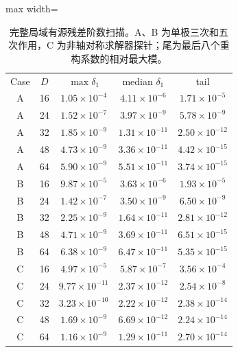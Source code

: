 \begin{table}[htbp]
\centering
\caption{完整局域有源残差阶数扫描。A、B 为单极三次和五次作用，C 为非轴对称求解器探针；尾为最后八个重构系数的相对最大模。}
\label{note-tab:sourced20261008}
\begin{adjustbox}{max width=\textwidth}
\begin{tabular}{ccccc}
Case & $D$ & $\max\delta_1$ & median $\delta_1$ & tail\\
A & 16 & $1.05\times10^{-4}$ & $4.11\times10^{-6}$ & $1.71\times10^{-5}$\\
A & 24 & $1.52\times10^{-7}$ & $3.97\times10^{-9}$ & $5.78\times10^{-9}$\\
A & 32 & $1.85\times10^{-9}$ & $1.31\times10^{-11}$ & $2.50\times10^{-12}$\\
A & 48 & $4.73\times10^{-9}$ & $3.36\times10^{-11}$ & $4.42\times10^{-15}$\\
A & 64 & $5.90\times10^{-9}$ & $5.51\times10^{-11}$ & $3.74\times10^{-15}$\\
B & 16 & $9.87\times10^{-5}$ & $3.63\times10^{-6}$ & $1.93\times10^{-5}$\\
B & 24 & $1.42\times10^{-7}$ & $3.50\times10^{-9}$ & $6.50\times10^{-9}$\\
B & 32 & $2.25\times10^{-9}$ & $1.64\times10^{-11}$ & $2.81\times10^{-12}$\\
B & 48 & $4.71\times10^{-9}$ & $3.69\times10^{-11}$ & $6.51\times10^{-15}$\\
B & 64 & $6.38\times10^{-9}$ & $6.47\times10^{-11}$ & $5.35\times10^{-15}$\\
C & 16 & $4.97\times10^{-5}$ & $5.87\times10^{-7}$ & $3.56\times10^{-4}$\\
C & 24 & $9.77\times10^{-11}$ & $2.37\times10^{-12}$ & $2.54\times10^{-8}$\\
C & 32 & $3.23\times10^{-10}$ & $2.22\times10^{-12}$ & $2.38\times10^{-14}$\\
C & 48 & $1.69\times10^{-9}$ & $6.69\times10^{-12}$ & $2.24\times10^{-14}$\\
C & 64 & $1.16\times10^{-9}$ & $1.29\times10^{-11}$ & $2.70\times10^{-14}$\\
\end{tabular}
\end{adjustbox}
\end{table}
